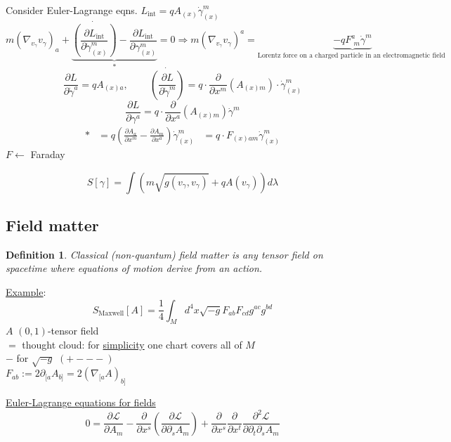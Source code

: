 \documentclass[10pt, twoside]{amsart}
\newtheorem{definition}{Definition}
\begin{document}
\begin{multicols*}{2}
Consider Euler-Lagrange eqns. $L_{\text{int}} = q A_{(x)} \dot{\gamma}^m_{(x)}$
\[
m (\nabla_{v_{\gamma}} v_{\gamma})_a + \underbrace{ \dot{ \left( \frac{ \partial L_{\text{int}} }{ \partial \dot{\gamma}^m_{(x)} } \right) }- \frac{ \partial L_{\text{int}} }{ \partial \gamma^m_{(x)} } }_{*} = 0  \Longrightarrow \boxed{ m (\nabla_{v_{\gamma} } v_{\gamma})^a = \underbrace{ -q F^a_{ \, \, m } \dot{\gamma}^m }_{\text{Lorentz force on a charged particle in an electromagnetic field } } }
\]
\[
\frac{ \partial L}{ \partial \dot{\gamma}^a} = qA_{(x)a}, \quad \quad \, \dot{ \left( \frac{ \partial L}{ \partial \dot{\gamma}^m} \right) } = q \cdot \frac{ \partial }{ \partial x^m} (A_{(x)m} ) \cdot \dot{\gamma}^m_{(x)}
\]
\[
\frac{ \partial L}{ \partial \gamma^a} = q \cdot \frac{ \partial }{ \partial x^a} (A_{(x)m} ) \dot{\gamma}^m
\]
\[
\begin{aligned}
* & = q\left( \frac{ \partial A_a}{ \partial x^m} - \frac{ \partial A_m}{ \partial x^a} \right) \dot{\gamma}^m_{(x)}
& = q \cdot F_{(x)am} \dot{\gamma}^m_{(x)}
\end{aligned}
\]
$F \leftarrow $ Faraday

\[
S[\gamma] = \int(m\sqrt{g(v_{\gamma},v_{\gamma} ) } + q A(v_{\gamma}) ) d\lambda
\]

\subsection{Field matter}

\begin{definition}
  Classical (non-quantum) field matter is any tensor field on spacetime where equations of motion derive from an action.
\end{definition}

\underline{Example}: 
\[
S_{\text{Maxwell}}[A] = \frac{1}{4}\int_M d^4x \sqrt{-g}F_{ab}F_{cd}g^{ac}g^{bd}
\]
$A$ $(0,1)$-tensor field \\
$=$ thought cloud: for \underline{simplicity} one chart covers all of $M$ \\
$-$ for $\sqrt{-g}$ $(+---)$ \\

$F_{ab} := 2\partial_{[a}A_{b]} = 2(\nabla_{[a} A)_{b]}$

\underline{Euler-Lagrange equations for fields}
\[
0 = \frac{ \partial \mathcal{L}}{ \partial A_m} - \frac{ \partial }{ \partial x^s} \left( \frac{ \partial \mathcal{L}}{ \partial \partial _s A_m } \right) + \frac{ \partial }{ \partial x^s} \frac{ \partial }{ \partial x^t} \frac{ \partial^2 \mathcal{L}}{ \partial \partial_t \partial_s A_m }
\]


\end{multicols*}
\end{document}
